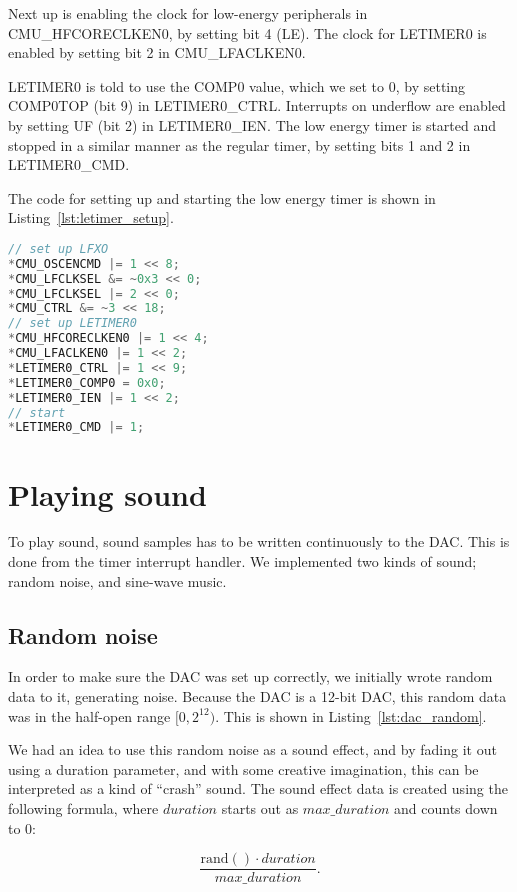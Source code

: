 Next up is enabling the clock for low-energy peripherals in CMU\_HFCORECLKEN0, by setting bit 4 (LE). The clock for LETIMER0 is enabled by setting bit 2 in CMU\_LFACLKEN0.

LETIMER0 is told to use the COMP0 value, which we set to 0, by setting COMP0TOP (bit 9) in LETIMER0\_CTRL. Interrupts on underflow are enabled by setting UF (bit 2) in LETIMER0\_IEN. The low energy timer is started and stopped in a similar manner as the regular timer, by setting bits 1 and 2 in LETIMER0\_CMD.

The code for setting up and starting the low energy timer is shown in Listing~\ref{lst:letimer_setup}.

\begin{lstlisting}[language=c, label=lst:letimer_setup, caption=Setting up and starting LETIMER0.]
// set up LFXO
*CMU_OSCENCMD |= 1 << 8;
*CMU_LFCLKSEL &= ~0x3 << 0;
*CMU_LFCLKSEL |= 2 << 0;
*CMU_CTRL &= ~3 << 18;
// set up LETIMER0
*CMU_HFCORECLKEN0 |= 1 << 4;
*CMU_LFACLKEN0 |= 1 << 2;
*LETIMER0_CTRL |= 1 << 9;
*LETIMER0_COMP0 = 0x0;
*LETIMER0_IEN |= 1 << 2;
// start
*LETIMER0_CMD |= 1;
\end{lstlisting}

\section{Playing sound}

To play sound, sound samples has to be written continuously to the DAC. This is done from the timer interrupt handler. We implemented two kinds of sound; random noise, and sine-wave music.

\subsection{Random noise}
\label{sec:random_noise}
In order to make sure the DAC was set up correctly, we initially wrote random data to it, generating noise. Because the DAC is a 12-bit DAC, this random data was in the half-open range $[0,2^{12})$. This is shown in Listing~\ref{lst:dac_random}.

We had an idea to use this random noise as a sound effect, and by fading it out using a duration parameter, and with some creative imagination, this can be interpreted as a kind of ``crash'' sound. The sound effect data is created using the following formula, where $duration$ starts out as $max\_duration$ and counts down to 0:

$$\frac{\mathrm{rand()} \cdot duration}{max\_duration}.$$


